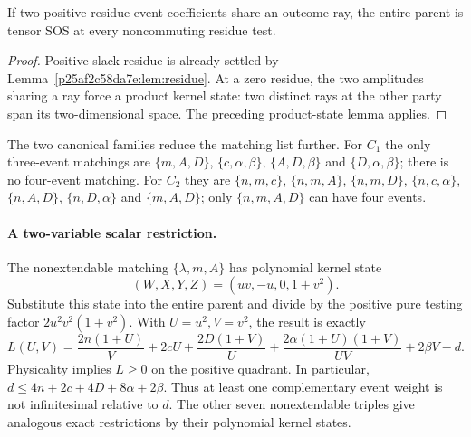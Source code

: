 \begin{corollary}
If two positive-residue event coefficients share an outcome ray, the entire parent is tensor SOS at every noncommuting residue test.
\end{corollary}
\begin{proof}
Positive slack residue is already settled by Lemma~\ref{p25af2c58da7e:lem:residue}. At a zero residue, the two amplitudes sharing a ray force a product kernel state: two distinct rays at the other party span its two-dimensional space. The preceding product-state lemma applies.
\end{proof}

The two canonical families reduce the matching list further. For $C_1$ the only three-event matchings are $\{m,A,D\}$, $\{c,\alpha,\beta\}$, $\{A,D,\beta\}$ and $\{D,\alpha,\beta\}$; there is no four-event matching. For $C_2$ they are $\{n,m,c\}$, $\{n,m,A\}$, $\{n,m,D\}$, $\{n,c,\alpha\}$, $\{n,A,D\}$, $\{n,D,\alpha\}$ and $\{m,A,D\}$; only $\{n,m,A,D\}$ can have four events.

\paragraph{A two-variable scalar restriction.}
The nonextendable matching $\{\lambda,m,A\}$ has polynomial kernel state
\[
(W,X,Y,Z)=(uv,-u,0,1+v^2).
\]
Substitute this state into the entire parent and divide by the positive pure testing factor $2u^2v^2(1+v^2)$. With $U=u^2,V=v^2$, the result is exactly
\[
L(U,V)=\frac{2n(1+U)}V+2cU+\frac{2D(1+V)}U
 +\frac{2\alpha(1+U)(1+V)}{UV}+2\beta V-d.
\]
Physicality implies $L\ge0$ on the positive quadrant. In particular,
$d\le4n+2c+4D+8\alpha+2\beta$. Thus at least one complementary event weight is not infinitesimal relative to $d$. The other seven nonextendable triples give analogous exact restrictions by their polynomial kernel states.

